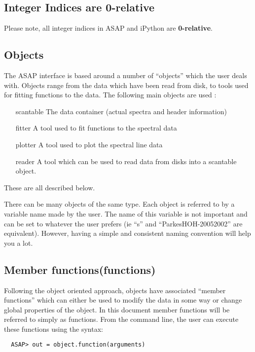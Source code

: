 \documentclass[11pt]{article}
\begin{document}
\subsection {Integer Indices are 0-relative}

Please note, all integer indices in ASAP and iPython are {\bf 0-relative}.

\subsection{Objects}

The ASAP interface is based around a number of ``objects'' which the
user deals with. Objects range from the data which have been read from
disk, to tools used for fitting functions to the data. The following
main objects are used :

\begin{itemize}
  \item[scantable] The data container (actual spectra and header information)
  \item[fitter] A tool used to fit functions to the spectral data
  \item[plotter] A tool used to plot the spectral line data
  \item[reader] A tool which can be used to read data from disks
    into a scantable object.
\end{itemize}

These are all described below.

There can be many objects of the same type. Each object is referred to 
by a variable name made by the user. The name of this variable is not
important and can be set to whatever the user prefers (ie ``s'' and
``ParkesHOH-20052002'' are equivalent).  However, having a simple and
consistent naming convention will help you a lot.

\subsection{Member functions(functions)}

Following the object oriented approach, objects have associated
``member functions'' which can either be used to modify the data in
some way or change global properties of the object. In this document
member functions will be referred to simply as functions. From the
command line, the user can execute these functions using the syntax:
\begin{verbatim}
  ASAP> out = object.function(arguments)
\end{verbatim}
\end{document}
